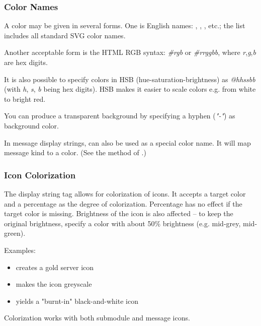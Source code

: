 \subsubsection{Color Names}
\label{sec:graphics:displaystring-color-names}

A color may be given in several forms. One is English names: ,
, , etc.; the list includes all standard SVG
color names.

Another acceptable form is the HTML RGB syntax: \textit{\#rgb} or
\textit{\#rrggbb}, where \textit{r},\textit{g},\textit{b} are hex digits.

It is also possible to specify colors in HSB (hue-saturation-brightness) as
\textit{@hhssbb} (with \textit{h}, \textit{s}, \textit{b} being hex digits).
HSB makes it easier to scale colors e.g. from white to bright red.

You can produce a transparent background by specifying a hyphen (\textit{"-"})
as background color.

In message display strings,  can also be used as a special color
name. It will map message kind to a color. (See the 
method of .)

\subsubsection{Icon Colorization}
\label{sec:graphics:displaystring-icon-colorization}

The  display string tag allows for colorization of icons.
It accepts a target color and a percentage as the degree of colorization.
Percentage has no effect if the target color is missing.
Brightness of the icon is also affected -- to keep the original brightness,
specify a color with about 50\% brightness (e.g.  mid-grey,
 mid-green).

Examples:

\begin{itemize}
  \item {} creates a gold server icon
  \item {} makes the icon greyscale
  \item {} yields a "burnt-in" black-and-white icon
\end{itemize}

Colorization works with both submodule and message icons.


